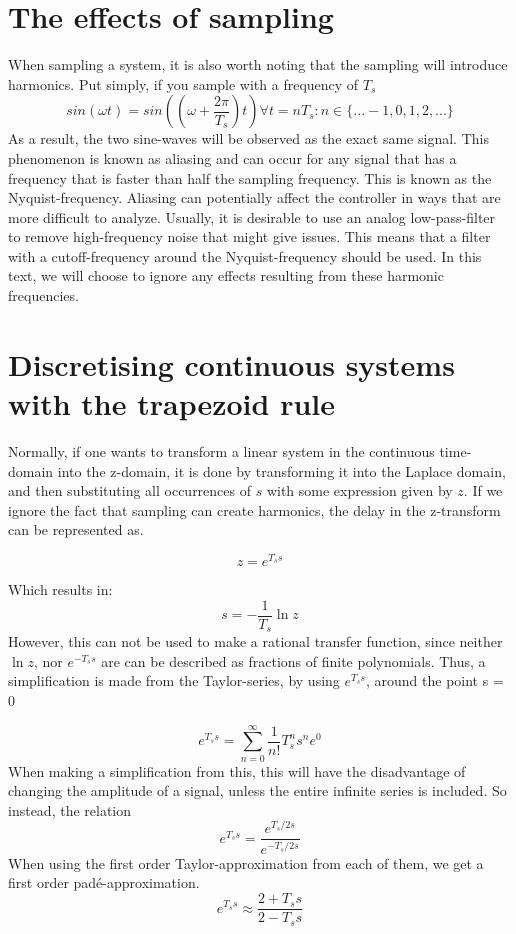 \section{The effects of sampling}
When sampling a system, it is also worth noting that the sampling will introduce harmonics. 
Put simply, if you sample with a frequency of $T_s$
\begin{equation}
sin(\omega t) = sin\left((\omega + \frac{2\pi}{T_s })t\right) \forall t = n T_s : n \in \{...-1, 0,1,2, ...\}
\end{equation}{}
 As a result, the two sine-waves will be observed as the exact same signal. This phenomenon is known as aliasing and can occur for any signal that has a frequency that is faster than half the sampling frequency. This is known as the Nyquist-frequency. Aliasing can potentially affect the controller in ways that are more difficult to analyze. Usually, it is desirable to use an analog low-pass-filter to remove high-frequency noise that might give issues. This means that a filter with a cutoff-frequency around the Nyquist-frequency should be used. In this text, we will choose to ignore any effects resulting from these harmonic frequencies. 
 
 
\section{Discretising continuous systems with the trapezoid rule}
Normally, if one wants to transform a linear system in the continuous time-domain into the z-domain, it is done by transforming it into the Laplace domain, and then substituting all occurrences of $s$ with some expression given by $z$. If we ignore the fact that sampling can create harmonics, the delay in the z-transform can be represented as.

\begin{equation}
z = e^{T_s s} 
\end{equation}{}

Which results in:
\begin{equation}
 s = -\frac{1}{T_s} \ln{z}
\end{equation}{}
However, this can not be used to make a rational transfer function, since neither $\ln{z}$, nor $e^{-T_ss}$ are can be described as fractions of finite polynomials. Thus, a simplification is made from the Taylor-series, by using $e^{T_s s}$, around the point s = 0 

\begin{equation}
 e^{T_s s} = \sum_{n =0}^\infty \frac{1}{n!} T_s^n s^n e^{0}
\end{equation}{}
When making a simplification from this, this will have the disadvantage of changing the amplitude of a signal, unless the entire infinite series is included. So instead, the relation
\begin{equation}
e^{T_s s} = \frac{e^{T_s/2 s}}{e^{-T_s/2 s}} 
\end{equation}{}
When using the first order Taylor-approximation from each of them, we get a first order padé-approximation. 
\begin{equation}
 e^{T_s s} \approx \frac{2 + T_s s}{2 - T_s s}
\end{equation}{}

